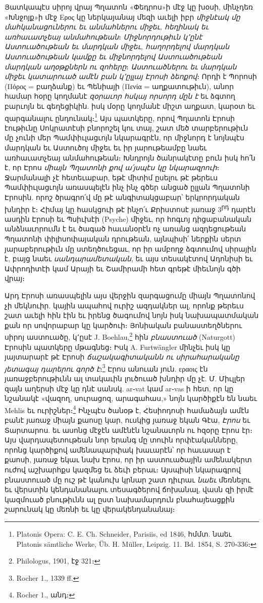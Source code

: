 \documentclass{article}
\begin{document}
{Յատկապէս սիրոյ վրայ Պղատոն «Փեդրոս»ի մէջ կը խօսի, մինչդեռ «Խնջոյք»ի մէջ Ερος կը ներկայանայ մեզի աւելի իբր \emph{միջնէակ մը մահկանացուներու եւ անմահներու միջեւ, հեղինակ եւ առհաւատչեայ անմահութեան}։ \emph{Միջնորդութիւն կ՚ընէ Աստուածութեան եւ մարդկան միջեւ, հաղորդելով մարդկան Աստուածութեան կամքը եւ միջնորդելով Աստուածութեան մարդկան աղօթքներն ու զոհերը}։ \emph{Աստուածներու եւ մարդկան միջեւ կատարուած ամէն բան կ՚ըլլայ Էրոսի ձեոքով}։ Որդի է Պորոսի (Πόρος = բաղձանք) եւ Պենիայի (Πενία = աղքատութիւն), անոր համար հօրը կողմանէ \emph{զօրաւոր հսկայ որսորդ մըն է} եւ ձգտող բարւոյն եւ գեղեցիկին. իսկ մօրը կողմանէ միշտ աղքատ, կարօտ եւ զարգանալու ընդունակ։\footnote{Platonis Opera: C. E. Ch. Schneider, Parisiis, ed 1846, հմմտ. նաեւ Platonis sämtliche Werke, Üb. H. Müller, Leipzig. 11. Bd. 1854, S. 270֊336։} Այս պատկերը, որով Պղատոն Էրոսի էութիւնը Սոկրատէսի բնորոշել կու տայ, շատ մեծ տարբերութիւն մը չունի մեր Պամփիւլացւոյն նկարագրէն, որ միջնորդ է նոյնպէս մարդկան եւ Աստուծոյ միջեւ եւ իր յարութեամբը նաեւ առհաւատչեայ անմահութեան։ Խնդրոյն ծանրակէտը բուն իսկ հո՛ն է, որ Էրոս \emph{միայն Պղատոնի քով ա՛յսպէս կը նկարազրուի}։ Ջարմանալի չէ հետեւաբար, եթէ միտիմ ըսելու թէ թերեւս Պամփիւլացւոյն առասպելէն ինչ ինչ գծեր անցած ըլլան Պղատոնի Էրոսին. որոշ ծրագրո՛վ մը թէ անգիտակցաբար՝ երկրորդական խնդիր է։ Հիմայ կը հասկցուի թէ ինչո՛ւ Քրիստոսէ յառաջ 3\textsuperscript{րդ} դարէն ասդին Էրոսի եւ Պսիւխէի (Psyche) միջեւ, որ հոգւոյ դիցաբանական անձնաւորումն է եւ ծագած հաւանօրէն ոչ առանց ազդեցութեան Պղատոնի փիլիսոփայական դրութեան, այնպիսի՛ ներքին սերտ յարաբերութիւն մը ստեղծուեցաւ, որ իր ամբողջ ձգտումով սիրային է, բայց նաեւ \emph{սանդարամետական}, եւ այս տեսակէտով Ադոնիսի եւ Ափրոդիտէի կամ Արայի եւ Շամիրամի հետ գրեթէ միեւնոյն գծի վրայ։

Արդ Էրոսի առասպելին այս վերջին զարգացումը միայն Պղատոնով չի մեկնուիր. կային ապահով ուրիշ ազդակներ ալ, որոնք թերեւս շատ աւելի հին էին եւ իրենց ծագումով նոյն իսկ նախապատմական քան որ սովորաբար կը կարծուի։ Յոնիական բանաստեղծներու սիրոյ աստուածը, կ՚ըսէ J. Boehlau,\footnote{Philologus, 1901, էջ 321։} հին \emph{բնաստուած} (Naturgott) Էրոսին պատկերը մթագնեց։ Իսկ A. Furtwängler մինչեւ իսկ կը յայտարարէ թէ Էրոսի \emph{ճաշակագիտականն ու սիրահարականը յետագայ դարերու գործ է}։\footnote{Rocher 1., 1339 ff.} Էրոս անուան յուն. εραοις էն յառաջբերութիւնն ալ տակաւին լուծուած խնդիր մը չէ. Մ. Միւլլեր զայն աղերսի մէջ կը դնէ սանսկ. ar֊vat կամ ar֊vas ի հետ, որ կը նշանակէ «վազող, սուրացոզ, արագահաս,» նոյն կարծիքէն են նաեւ Mehlis եւ ուրիշներ։\footnote{Rocher 1., անդ։} Ինչպէս ծանօթ է, Հեսիոդոսի համաձայն ամէն բանէ յառաջ միայն քաոսը կար, ուսկից յառաջ եկան Գէա, \emph{Էրոս} եւ Տարտարոս. եւ ասոնց մէջէն ամէնէն նշանաւորն ու հզօրը Էրոս էր։ Այս վարդապետութեան նոր երանգ մը տուին որփէականները, որոնց կարծիքով ամենապարփակ խաւարէն՝ որ հաւասար է քաոսի, յառաջ եկաւ նախ Էրոս, որ իր աստուածային ամենակերտ ուժով աշխարհքս կազմեց եւ ձեւի բերաւ։ Այսպիսի նկարագրով բնաստուած մը ուշ թէ կանուխ կրնար շատ դիւրաւ \emph{նաեւ} մեռնելու եւ վերստին կենդանանալու տեսագծերով ճոխանալ, վասն զի իրմէ կազմուած բնութիւնն ալ ըստ նախամարդուն բնահայեացքին շարունակ կը մեռնի եւ կը վերակենդանանայ։

}
\end{document}
